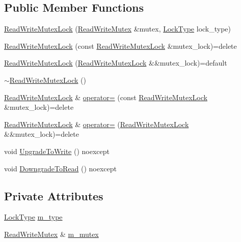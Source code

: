 \subsection*{Public Member Functions}
\begin{DoxyCompactItemize}
\item 
\hyperlink{structmage_1_1_read_write_mutex_lock_a730f610a65e967fd0e44f86f9b558603}{Read\+Write\+Mutex\+Lock} (\hyperlink{structmage_1_1_read_write_mutex}{Read\+Write\+Mutex} \&mutex, \hyperlink{structmage_1_1_read_write_mutex_lock_a5fee0529edf58803ee1f5d4afa084a3b}{Lock\+Type} lock\+\_\+type)
\item 
\hyperlink{structmage_1_1_read_write_mutex_lock_a2c9cd6329bfd18c4752235ebee7edb4a}{Read\+Write\+Mutex\+Lock} (const \hyperlink{structmage_1_1_read_write_mutex_lock}{Read\+Write\+Mutex\+Lock} \&mutex\+\_\+lock)=delete
\item 
\hyperlink{structmage_1_1_read_write_mutex_lock_a5d3ca97393acd046c49b0d3550894007}{Read\+Write\+Mutex\+Lock} (\hyperlink{structmage_1_1_read_write_mutex_lock}{Read\+Write\+Mutex\+Lock} \&\&mutex\+\_\+lock)=default
\item 
\hyperlink{structmage_1_1_read_write_mutex_lock_a64b600234d29ba7307fcd77a17486582}{$\sim$\+Read\+Write\+Mutex\+Lock} ()
\item 
\hyperlink{structmage_1_1_read_write_mutex_lock}{Read\+Write\+Mutex\+Lock} \& \hyperlink{structmage_1_1_read_write_mutex_lock_ade82a57f337e39a1515f67fbc1f6fc43}{operator=} (const \hyperlink{structmage_1_1_read_write_mutex_lock}{Read\+Write\+Mutex\+Lock} \&mutex\+\_\+lock)=delete
\item 
\hyperlink{structmage_1_1_read_write_mutex_lock}{Read\+Write\+Mutex\+Lock} \& \hyperlink{structmage_1_1_read_write_mutex_lock_a0c31334330a9259b0b68d71b9ee13704}{operator=} (\hyperlink{structmage_1_1_read_write_mutex_lock}{Read\+Write\+Mutex\+Lock} \&\&mutex\+\_\+lock)=delete
\item 
void \hyperlink{structmage_1_1_read_write_mutex_lock_a25629916d6a73e930763c34aaa13c647}{Upgrade\+To\+Write} () noexcept
\item 
void \hyperlink{structmage_1_1_read_write_mutex_lock_a1300da588c4a0950cca5a3b6a65d5f29}{Downgrade\+To\+Read} () noexcept
\end{DoxyCompactItemize}
\subsection*{Private Attributes}
\begin{DoxyCompactItemize}
\item 
\hyperlink{structmage_1_1_read_write_mutex_lock_a5fee0529edf58803ee1f5d4afa084a3b}{Lock\+Type} \hyperlink{structmage_1_1_read_write_mutex_lock_a754d235c4ba2f8f8da51342ad497a735}{m\+\_\+type}
\item 
\hyperlink{structmage_1_1_read_write_mutex}{Read\+Write\+Mutex} \& \hyperlink{structmage_1_1_read_write_mutex_lock_a6ee9034fa984e11ec07c20ec77ab1bfe}{m\+\_\+mutex}
\end{DoxyCompactItemize}



